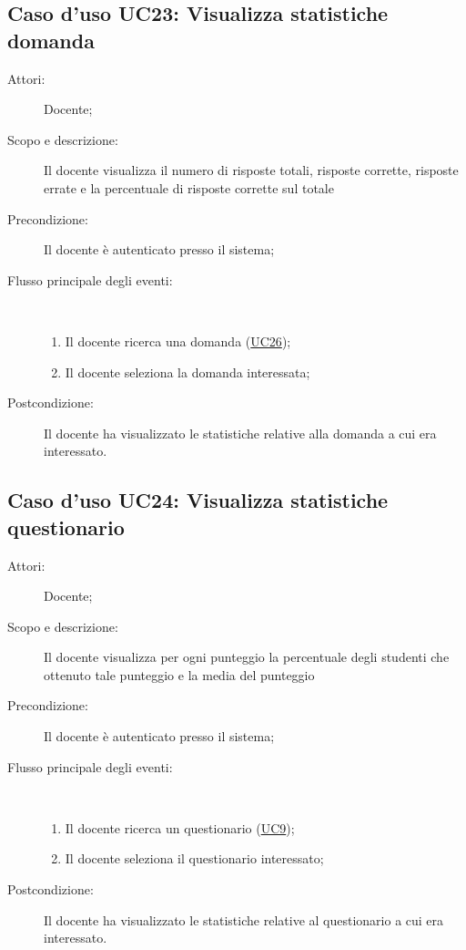 \subsection{Caso d'uso UC23: Visualizza statistiche domanda}\begin{description}
	\item[Attori:] Docente;
	\item[Scopo e descrizione:] Il docente visualizza il numero di risposte totali, risposte corrette, risposte errate e la percentuale di risposte corrette sul totale
	\item[Precondizione:] Il docente è autenticato presso il sistema;
	
	\item[Flusso principale degli eventi:] \ 
	\begin{enumerate}
		\item Il docente ricerca una domanda (\hyperlink{UC26}{UC26});
		\item Il docente seleziona la domanda interessata;
		
	\end{enumerate}
	\item[Postcondizione:] Il docente ha visualizzato le statistiche relative alla domanda a cui era interessato.
\end{description}
\hypertarget{UC24}{}
\subsection{Caso d'uso UC24: Visualizza statistiche questionario}\begin{description}
	\item[Attori:] Docente;
	\item[Scopo e descrizione:] Il docente visualizza per ogni punteggio la percentuale degli studenti che ottenuto tale punteggio e la media del punteggio
	\item[Precondizione:] Il docente è autenticato presso il sistema;
	
	\item[Flusso principale degli eventi:] \ 
	\begin{enumerate}
		\item Il docente ricerca un questionario (\hyperlink{UC9}{UC9});
		\item Il docente seleziona il questionario interessato;
		
	\end{enumerate}
	\item[Postcondizione:] Il docente ha visualizzato le statistiche relative al questionario a cui era interessato.
\end{description}
\hypertarget{UC25}{}
